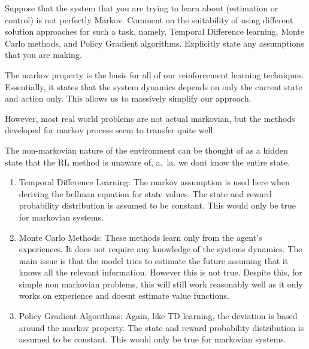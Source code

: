 \documentclass[addpoints,12pt,solution]{exam}
\begin{document}
\begin{questions}
\begin{solution}
\begin{itemize}
            \end{itemize}


        \end{solution}

        \question[5] [TD, MC, PG] Suppose that the system that you are trying to learn about (estimation or control) is not perfectly Markov. Comment on the suitability of using different solution approaches for such a task, namely, Temporal Difference learning, Monte Carlo methods, and Policy Gradient algorithms. Explicitly state any assumptions that you are making.
        \begin{solution}
            The markov property is the basis for all of our reinforcement learning techniques.
            Essentially, it states that the system dynamics depends on only the current state and action only.
            This allows us to massively simplify our approach.

            However, most real world problems are not actual markovian, but the methods developed for markov process seem to transfer quite well.

            The non-markovian nature of the environment can be thought of as a hidden state that the RL method is unaware of, a.\ la. we dont know the entire state.

            \begin{enumerate}
                \item Temporal Difference Learning:
                The markov assumption is used here when deriving the bellman equation for state values.
                The state and reward probability distribution is assumed to be constant. This would only be true for markovian systems.

                \item Monte Carlo Methods:
                These methods learn only from the agent's experiences. It does not require any knowledge of the systems dynamics.
                The main issue is that the model tries to estimate the future assuming that it knows all the relevant information. However this is not true.
                Despite this, for simple non markovian problems, this will still work reasonably well as it only works on experience and doesnt estimate value functions.
                \item Policy Gradient Algorithms:
                Again, like TD learning, the deviation is based around the markov property. The state and reward probability distribution is assumed to be constant. This would only be true for markovian systems.


\end{enumerate}
\end{solution}
\end{questions}
\end{document}
